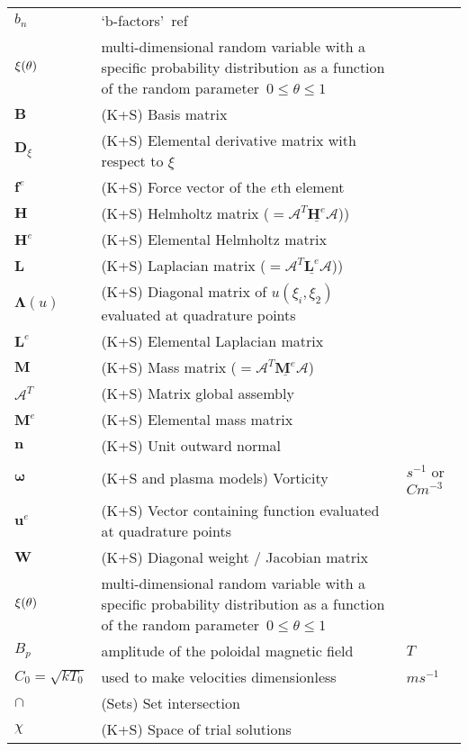\begin{longtable}{|p{3.0cm}|p{10.0cm}|p{3.0cm}|}
$b_n$ & `b-factors'~ref~\cite[slide 21]{omullane} & \\
${\boldmath \xi}(\theta)$ & multi-dimensional random variable with a specific probability distribution as a function of the random parameter~$0\leq\theta\leq 1$ & \\
$\boldsymbol{B}$ &  (K+S) Basis matrix & \\
$\boldsymbol{D}_{\xi}$ &  (K+S) Elemental derivative matrix with respect to $\xi$ & \\
$\boldsymbol{f}^e$ &  (K+S) Force vector of the $e$th element & \\
$\boldsymbol{H}$ &  (K+S) Helmholtz matrix ($=\mathcal{A}^T \underline{\boldsymbol{H}^e} \mathcal{A}$)) & \\
$\boldsymbol{H}^e$ &  (K+S) Elemental Helmholtz matrix & \\
$\boldsymbol{L}$ &  (K+S) Laplacian matrix ($=\mathcal{A}^T \underline{\boldsymbol{L}^e} \mathcal{A}$)) & \\
$\boldsymbol{\Lambda}(u)$ &  (K+S) Diagonal matrix of $u(\xi_i, \xi_2)$ evaluated at quadrature points & \\
$\boldsymbol{L}^e$ &  (K+S) Elemental Laplacian matrix & \\
$\boldsymbol{M}$ &  (K+S) Mass matrix ($=\mathcal{A}^T \underline{\boldsymbol{M}^e} \mathcal{A}$) & \\
$\boldsymbol{\mathcal{A}}^T$ &  (K+S) Matrix global assembly & \\
$\boldsymbol{M}^e$ &  (K+S) Elemental mass matrix & \\
$\boldsymbol{n}$ &  (K+S) Unit outward normal & \\
$\boldsymbol{\omega}$ &  (K+S and plasma models) Vorticity & $s^{-1}$ or $C m^{-3}$\\
$\boldsymbol{u}^e$ &  (K+S) Vector containing function evaluated at quadrature points & \\
$\boldsymbol{W}$ &  (K+S) Diagonal weight / Jacobian matrix & \\
${\boldmath \xi}(\theta)$ & multi-dimensional random variable with a specific probability distribution as a function of the random parameter~$0\leq\theta\leq 1$ & \\
$B_p$ & amplitude of the poloidal magnetic field  &  $T$  \\
$C_0=\sqrt{kT_0}$ & used to make velocities dimensionless  &  $m s^{-1}$ \\
$\cap$ &  (Sets) Set intersection & \\
$\chi$ &  (K+S) Space of trial solutions & \\

\end{longtable}
